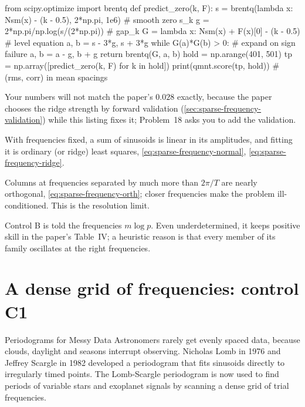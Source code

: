 \begin{pycode}
from scipy.optimize import brentq
def predict_zero(k, F):
    s = brentq(lambda x: Nsm(x) - (k - 0.5), 2*np.pi, 1e6)  # smooth zero s_k
    g = 2*np.pi/np.log(s/(2*np.pi))                          # gap_k
    G = lambda x: Nsm(x) + F(x)[0] - (k - 0.5)               # level equation
    a, b = s - 3*g, s + 3*g
    while G(a)*G(b) > 0:                                     # expand on sign failure
        a, b = a - g, b + g
    return brentq(G, a, b)
hold = np.arange(401, 501)
tp = np.array([predict_zero(k, F) for k in hold])
print(qmnt.score(tp, hold))        # (rms, corr) in mean spacings
\end{pycode}

Your numbers will not match the paper's $0.028$ exactly, because the paper chooses the ridge strength by forward validation (\cref{sec:sparse-frequency-validation}) while this listing fixes it; Problem~18 asks you to add the validation.

\begin{keyideas}
\item With frequencies fixed, a sum of sinusoids is linear in its amplitudes, and fitting it is ordinary (or ridge) least squares, \eqref{eq:sparse-frequency-normal}, \eqref{eq:sparse-frequency-ridge}.
\item Columns at frequencies separated by much more than $2\pi/T$ are nearly orthogonal, \eqref{eq:sparse-frequency-orth}; closer frequencies make the problem ill-conditioned. This is the resolution limit.
\item Control B is told the frequencies $m\log p$. Even underdetermined, it keeps positive skill in the paper's Table~IV; a heuristic reason is that every member of its family oscillates at the right frequencies.
\end{keyideas}

\section{A dense grid of frequencies: control C1}\label{sec:sparse-frequency-dense}
\begin{didyouknow}{Periodograms for Messy Data}
Astronomers rarely get evenly spaced data, because clouds, daylight and seasons interrupt observing. Nicholas Lomb in 1976 and Jeffrey Scargle in 1982 developed a periodogram that fits sinusoids directly to irregularly timed points. The Lomb-Scargle periodogram is now used to find periods of variable stars and exoplanet signals by scanning a dense grid of trial frequencies.
\end{didyouknow}

